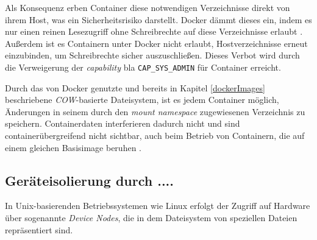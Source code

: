 \documentclass[../main.tex]{subfiles}
\begin{document}
			Als Konsequenz erben Container diese notwendigen Verzeichnisse direkt von ihrem Host, was ein Sicherheitsrisiko darstellt. Docker dämmt dieses ein, indem es nur einen reinen Lesezugriff ohne Schreibrechte auf diese Verzeichnisse erlaubt \cite[S.4]{dockerSecIntro}. Außerdem ist es Containern unter Docker nicht erlaubt, Hostverzeichnisse erneut einzubinden, um Schreibrechte sicher auszuschließen. Dieses Verbot wird durch die Verweigerung der \emph{capability} bla \texttt{CAP\_SYS\_ADMIN} für Container erreicht.

			Durch das von Docker genutzte und bereits in Kapitel \ref{dockerImages} beschriebene \emph{\acrshort{COW}}-basierte Dateisystem, ist es jedem Container möglich, Änderungen in seinem durch den \emph{mount namespace} zugewiesenen Verzeichnis zu speichern. Containerdaten interferieren dadurch nicht und sind containerübergreifend nicht sichtbar, auch beim Betrieb von Containern, die auf einem gleichen Basisimage beruhen \cite[S.4]{dockerSecIntro}.


			\cite[S.4]{dockerSec1}


    \subsection{Geräteisolierung durch ....}

			In Unix-basierenden Betriebssystemen wie Linux erfolgt der Zugriff auf Hardware über sogenannte \emph{Device Nodes}, die in dem Dateisystem von speziellen Dateien repräsentiert sind.
\end{document}
